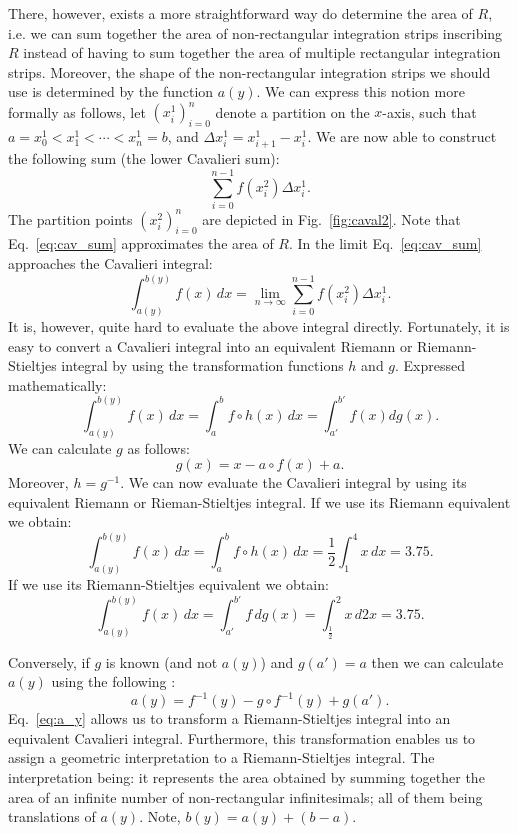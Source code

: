 \documentclass{article}
\theoremstyle{theorem}
\theoremstyle{definition}
\begin{document}
\noindent
There, however, exists a more straightforward way do determine the area of $R$, i.e. we can sum together the area of non-rectangular integration strips inscribing $R$ instead of
having to sum together the area of multiple rectangular integration strips. Moreover, the shape of the non-rectangular integration strips we should use is determined by the function $a(y)$. We can express this notion more formally as 
follows, let $(x_i^1)_{i=0}^{n}$ denote a partition on the $x$-axis, such that $a = x_0^1 < x_1^1 < \cdots < x_n^1 = b$, and $\Delta x_i^1 = x_{i+1}^1 - x_i^1$.
We are now able to construct the following sum (the lower Cavalieri sum):
\begin{equation}
\label{eq:cav_sum}
\sum_{i=0}^{n-1} f(x_i^2)\Delta x_i^1.
\end{equation}
The partition points $(x_i^2)_{i=0}^{n}$ are depicted in Fig.~\ref{fig:caval2}. Note that Eq.~\eqref{eq:cav_sum} approximates the area of $R$. In the limit Eq.~\eqref{eq:cav_sum} approaches 
the Cavalieri integral:
\begin{equation}
\label{eq:caval1}
\int_{a(y)}^{b(y)}f(x)\, dx = \lim_{n\to \infty}\sum_{i=0}^{n-1} f(x_i^2)\Delta x_i^1.
\end{equation}
It is, however, quite hard to evaluate the above integral directly. Fortunately, it is easy to convert a Cavalieri integral into an equivalent Riemann or Riemann-Stieltjes 
integral by using the transformation functions $h$ and $g$. Expressed mathematically:
\begin{equation}
\label{eq:main_cav}
\int_{a(y)}^{b(y)}f(x)\,dx =\int_a^b f \circ h (x)\, dx = \int_{a'}^{b'} f(x) dg(x).
\end{equation}
We can calculate $g$ as follows:
\begin{equation}
g(x) = x - a\circ f(x) + a.
\end{equation}
Moreover, $h=g^{-1}$. We can now evaluate the Cavalieri integral by using its equivalent Riemann or Rieman-Stieltjes integral.
If we use its Riemann equivalent we obtain:
\begin{equation}
\int_{a(y)}^{b(y)}f(x)\, dx = \int_a^b f \circ h (x)\, dx = \dfrac{1}{2}\int_1^4x\, dx = 3.75.  
\end{equation}
If we use its Riemann-Stieltjes equivalent we obtain:
\begin{equation}
\int_{a(y)}^{b(y)}f(x)\, dx = \int_{a'}^{b'} f \, dg(x) = \int_{\frac{1}{2}}^2x\, d2x = 3.75.  
\end{equation}

\noindent
Conversely, if $g$ is known (and not $a(y)$) and $g(a') = a$ then we can calculate $a(y)$ using the following \cite{grobler19}:
\begin{equation}
\label{eq:a_y}
a(y) = f^{-1}(y) - g\circ f^{-1}(y) + g(a'). 
\end{equation}
Eq.~\eqref{eq:a_y} allows us to transform a Riemann-Stieltjes integral into an equivalent Cavalieri integral. 
Furthermore, this transformation enables us to assign a geometric interpretation to a Riemann-Stieltjes integral. The interpretation being:
it represents the area obtained by summing together the area of an infinite number of non-rectangular infinitesimals; all of them being translations of $a(y)$. Note,
$b(y) = a(y) + (b-a)$.
\end{document}
